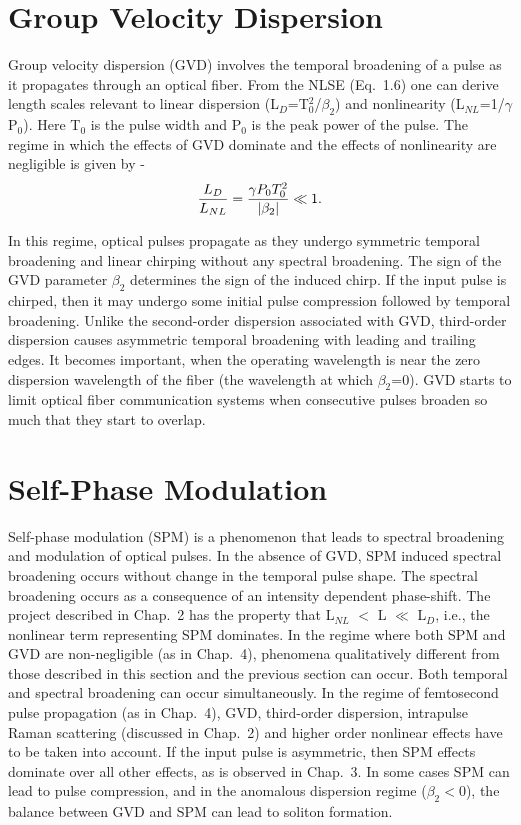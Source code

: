 \section{Group Velocity Dispersion}

Group velocity dispersion \cite{Agrawal3} (GVD) involves the temporal broadening of a pulse as it propagates through an optical fiber. From the NLSE (Eq.\ 1.6) one can derive length scales relevant to linear dispersion (L$_{D}$=T$_{0}^{2}$/$\beta_{2}$) and nonlinearity (L$_{NL}$=1/$\gamma$P$_{0}$). Here T$_{0}$ is the pulse width and P$_{0}$ is the peak power of the pulse. The regime in which the effects of GVD dominate and the effects of nonlinearity are negligible is given by -
\begin{equation}
{L_{D} \over L_{NL}}={\gamma P_{0} T_{0}^{2} \over |\beta_{2}|} \ll 1 .
\end{equation}

In this regime, optical pulses propagate as they undergo symmetric temporal broadening and linear chirping without any spectral broadening. The sign of the GVD parameter $\beta_{2}$ determines the sign of the induced chirp. If the input pulse is chirped, then it may undergo some initial pulse compression followed by temporal broadening. Unlike the second-order dispersion associated with GVD, third-order dispersion causes asymmetric temporal broadening with leading and trailing edges. It becomes important, when the operating wavelength is near the zero dispersion wavelength of the fiber (the wavelength at which $\beta_{2}$=0). GVD starts to limit optical fiber communication systems when consecutive pulses broaden so much that they start to overlap.

\section{Self-Phase Modulation}

Self-phase modulation \cite{Agrawal4} (SPM) is a phenomenon that leads to spectral broadening and modulation of optical pulses. In the absence of GVD, SPM induced spectral broadening occurs without change in the temporal pulse shape. The spectral broadening occurs as a consequence of an intensity dependent phase-shift. The project described in Chap.\ 2 has the property that L$_{NL}$ $<$ L $\ll$ L$_D$, i.e., the nonlinear term representing SPM dominates. In the regime where both SPM and GVD are non-negligible (as in Chap.\ 4), phenomena qualitatively different from those described in this section and the previous section can occur. Both temporal and spectral broadening can occur simultaneously. In the regime of femtosecond pulse propagation (as in Chap.\ 4), GVD, third-order dispersion, intrapulse Raman scattering (discussed in Chap.\ 2) and higher order nonlinear effects have to be taken into account. If the input pulse is asymmetric, then SPM effects dominate over all other effects, as is observed in Chap.\ 3. In some cases SPM can lead to pulse compression, and in the anomalous dispersion regime ($\beta_2 < 0$), the balance between GVD and SPM can lead to soliton formation.

